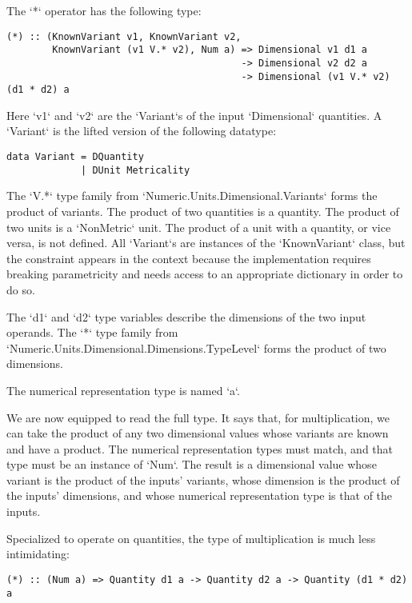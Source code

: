 \documentclass[11pt]{report}
\begin{document}
The `*` operator has the following type:

\begin{lstlisting}
(*) :: (KnownVariant v1, KnownVariant v2,
        KnownVariant (v1 V.* v2), Num a) => Dimensional v1 d1 a
                                         -> Dimensional v2 d2 a
                                         -> Dimensional (v1 V.* v2) (d1 * d2) a
\end{lstlisting}

Here `v1` and `v2` are the `Variant`s of the input `Dimensional` quantities. A `Variant` is the lifted version of the
following datatype:

\begin{lstlisting}
data Variant = DQuantity
             | DUnit Metricality
\end{lstlisting}

The `V.*` type family from `Numeric.Units.Dimensional.Variants` forms the product of variants. The product of two quantities is a quantity.
The product of two units is a `NonMetric` unit. The product of a unit with a quantity, or vice versa, is not defined. All `Variant`s are
instances of the `KnownVariant` class, but the constraint appears in the context because the implementation requires breaking parametricity and
needs access to an appropriate dictionary in order to do so.

The `d1` and `d2` type variables describe the dimensions of the two input operands. The `*` type family from `Numeric.Units.Dimensional.Dimensions.TypeLevel`
forms the product of two dimensions.

The numerical representation type is named `a`.

We are now equipped to read the full type. It says that, for multiplication, we can take the product of any two dimensional values whose
variants are known and have a product. The numerical representation types must match, and that type must be an instance of `Num`. The result is a dimensional value
whose variant is the product of the inputs' variants, whose dimension is the product of the inputs' dimensions, and whose numerical representation
type is that of the inputs.

Specialized to operate on quantities, the type of multiplication is much less intimidating:

\begin{lstlisting}
(*) :: (Num a) => Quantity d1 a -> Quantity d2 a -> Quantity (d1 * d2) a
\end{lstlisting}
\end{document}
